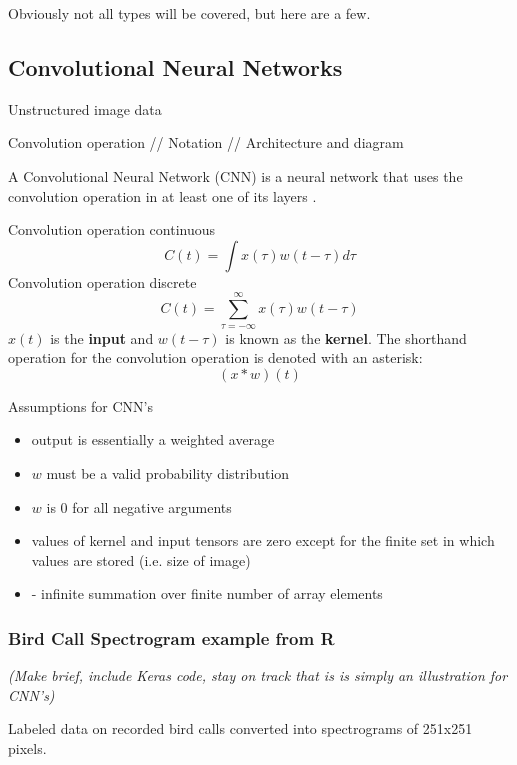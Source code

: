 Obviously not all types will be covered, but here are a few.  


\subsection{Convolutional Neural Networks}
Unstructured image data

Convolution operation // Notation // Architecture and diagram

A Convolutional Neural Network (CNN) is a neural network that uses the convolution operation in at least one of its layers \cite{?}.

Convolution operation continuous
$$
C(t) = \int x(\tau)w(t - \tau)d\tau
$$
Convolution operation discrete
$$
C(t) = \sum_{\tau = -\infty}^\infty x(\tau)w(t - \tau)
$$
$x(t)$ is the \textbf{input} and $w(t-\tau)$ is known as the \textbf{kernel}. The shorthand operation for the convolution operation is denoted with an asterisk:
$$
(x * w)(t)
$$

Assumptions for CNN's \cite{Goodfellow-et-al-2016}

\begin{itemize}
  \tightlist
  \item
output is essentially a weighted average  
 \item
$w$ must be a valid probability distribution
 \item
$w$ is 0 for all negative arguments
 \item
values of kernel and input tensors are zero except for the finite set in which values are stored (i.e. size of image)
 \item
 - infinite summation over finite number of array elements
\end{itemize}


\subsubsection{Bird Call Spectrogram example from R}

\textit{(Make brief, include Keras code, stay on track that is is simply an illustration for CNN's)}

Labeled data on recorded bird calls converted into spectrograms of 251x251 pixels.


